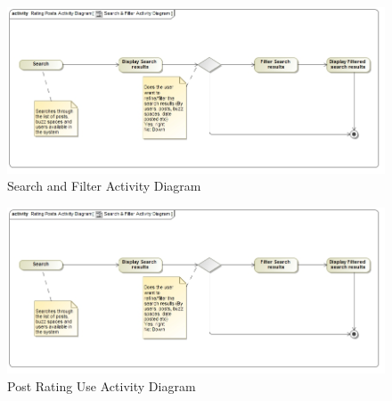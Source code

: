 \documentclass[11pt]{article}
\begin{document}
					
	
	\graphicspath{ {../Diagrams/Sphe/Search&Filter/} }
	  \begin{figure}[H]	
    	\includegraphics[scale=0.65]{ActivityDiagram.jpg}
    	\caption{Search and Filter Activity Diagram}
	\end{figure}
	
	\graphicspath{ {../Diagrams/Sphe/PostRatings/} }
	  \begin{figure}[H]	
    	\includegraphics[scale=0.65]{ActivityDiagram.jpg}
    	\caption{Post Rating Use Activity Diagram}
	\end{figure}
	
\end{document}
